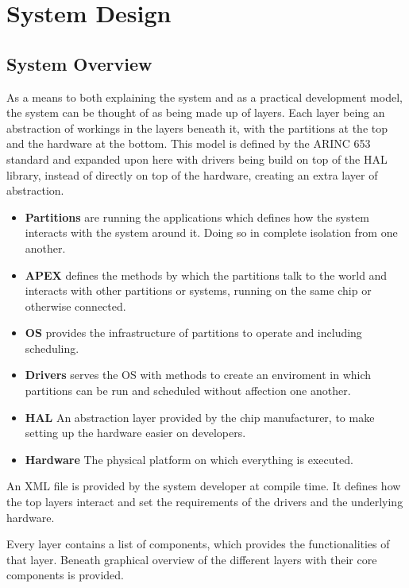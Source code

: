 \chapter{System Design}



\section{System Overview}
As a means to both explaining the system and as a practical development model,
the system can be thought of as being made up of layers.
Each layer being an abstraction of workings in the layers beneath it,
with the partitions at the top and the hardware at the bottom.
This model is defined by the ARINC 653 standard
and expanded upon here with drivers being build on top of the HAL library,
instead of directly on top of the hardware,
creating an extra layer of abstraction.

\begin{itemize}
	\item \textbf{Partitions}
		are running the applications which defines how the system interacts
		with the system around it.
		Doing so in complete isolation from one another.
	\item \textbf{APEX}
		defines the methods by which the partitions talk to the world and
		interacts with other partitions or systems, running
		on the same chip or otherwise connected.
	\item \textbf{OS}
		provides the infrastructure of partitions to operate and
		including scheduling.
	\item \textbf{Drivers}
		serves the OS with methods to create an enviroment in which partitions
		can be run and scheduled without affection one another.
	\item \textbf{HAL}
		An abstraction layer provided by the chip manufacturer,
		to make setting up the hardware easier on developers.
	\item \textbf{Hardware}
		The physical platform on which everything is executed.
\end{itemize}

An XML file is provided by the system developer at compile time.
It defines how the top layers interact and set the requirements of the drivers
and the underlying hardware.

Every layer contains a list of components, which provides the functionalities
of that layer.
Beneath graphical overview of the different layers with their core components
is provided.

